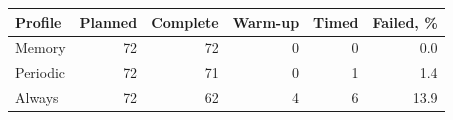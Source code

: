 \begin{tabular}{lrrrrr}
\toprule
Profile & Planned & Complete & Warm-up & Timed & Failed, \%\\
\midrule
Memory & 72 & 72 & 0 & 0 & 0.0\\
Periodic & 72 & 71 & 0 & 1 & 1.4\\
Always & 72 & 62 & 4 & 6 & 13.9\\
\bottomrule
\end{tabular}
